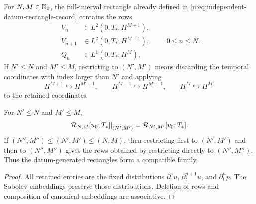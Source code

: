 \begin{definition}
\label{u:def:finite-window-space}
For \(N,M\in\mathbb N_0\), the full-interval rectangle already defined in
\eqref{u:eq:independent-datum-rectangle-record} contains the rows
\begin{equation}
 \begin{aligned}
 V_n&\in L^2(0,T_*;H^{M+1}),\\
 V_{n+1}&\in L^2(0,T_*;H^{M-1}),\\
 Q_n&\in L^1(0,T_*;H^M),
 \end{aligned}
 \qquad 0\le n\le N.
 \label{u:eq:whole-terminal-rectangle-element}
\end{equation}
If \(N'\le N\) and \(M'\le M\), restricting to \((N',M')\) means discarding
the temporal coordinates with index larger than \(N'\) and applying
\[
 H^{M+1}\hookrightarrow H^{M'+1},
 \qquad H^{M-1}\hookrightarrow H^{M'-1},
 \qquad H^M\hookrightarrow H^{M'}
\]
to the retained coordinates.
\end{definition}

\begin{proposition}
\label{u:prop:rectangle-compatibility}
For \(N'\le N\) and \(M'\le M\),
\begin{equation}
 \left.\mathcal R_{N,M}[u_0;T_*]\right|_{(N',M')}
 =\mathcal R_{N',M'}[u_0;T_*].
 \label{u:eq:rectangle-compatibility}
\end{equation}
If
\((N'',M'')\le(N',M')\le(N,M)\), then
restricting first to \((N',M')\) and then to \((N'',M'')\) gives the
rows obtained by restricting directly to \((N'',M'')\).  Thus the datum-generated
rectangles form a compatible family.
\end{proposition}

\begin{proof}
All retained entries are the fixed distributions
\(\partial_t^nu\), \(\partial_t^{n+1}u\), and \(\partial_t^np\).
The Sobolev embeddings preserve those distributions.  Deletion of rows and
composition of canonical embeddings are associative.
\end{proof}
